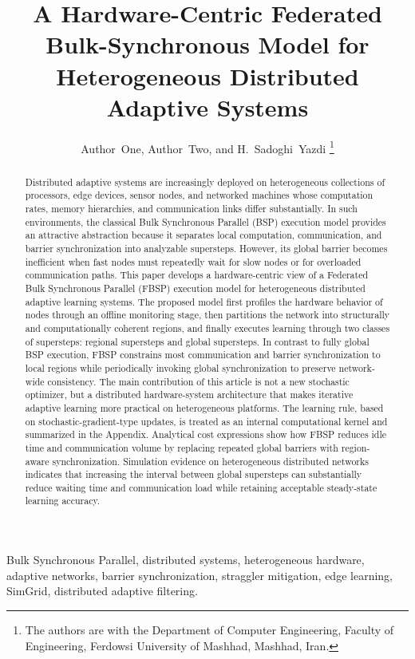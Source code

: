 ﻿\documentclass[10pt,journal]{IEEEtran}
\title{A Hardware-Centric Federated Bulk-Synchronous Model for Heterogeneous Distributed Adaptive Systems}
\author{
	Author~One, Author~Two, and H.~Sadoghi~Yazdi%
	\thanks{The authors are with the Department of Computer Engineering, Faculty of Engineering, Ferdowsi University of Mashhad, Mashhad, Iran.}
}
\begin{document}
	
	\maketitle
	
	\begin{abstract}
		Distributed adaptive systems are increasingly deployed on heterogeneous collections of processors, edge devices, sensor nodes, and networked machines whose computation rates, memory hierarchies, and communication links differ substantially. In such environments, the classical Bulk Synchronous Parallel (BSP) execution model provides an attractive abstraction because it separates local computation, communication, and barrier synchronization into analyzable supersteps. However, its global barrier becomes inefficient when fast nodes must repeatedly wait for slow nodes or for overloaded communication paths. This paper develops a hardware-centric view of a Federated Bulk Synchronous Parallel (FBSP) execution model for heterogeneous distributed adaptive learning systems. The proposed model first profiles the hardware behavior of nodes through an offline monitoring stage, then partitions the network into structurally and computationally coherent regions, and finally executes learning through two classes of supersteps: regional supersteps and global supersteps. In contrast to fully global BSP execution, FBSP constrains most communication and barrier synchronization to local regions while periodically invoking global synchronization to preserve network-wide consistency. The main contribution of this article is not a new stochastic optimizer, but a distributed hardware-system architecture that makes iterative adaptive learning more practical on heterogeneous platforms. The learning rule, based on stochastic-gradient-type updates, is treated as an internal computational kernel and summarized in the Appendix. Analytical cost expressions show how FBSP reduces idle time and communication volume by replacing repeated global barriers with region-aware synchronization. Simulation evidence on heterogeneous distributed networks indicates that increasing the interval between global supersteps can substantially reduce waiting time and communication load while retaining acceptable steady-state learning accuracy.
	\end{abstract}
	
	\begin{IEEEkeywords}
		Bulk Synchronous Parallel, distributed systems, heterogeneous hardware, adaptive networks, barrier synchronization, straggler mitigation, edge learning, SimGrid, distributed adaptive filtering.
	\end{IEEEkeywords}
	
\end{document}

